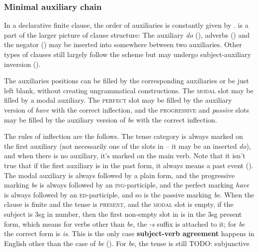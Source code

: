 \documentclass[UTF8, a4paper, oneside, scheme=plain]{ctexrep}
\newcommand*{\concept}[1]{\textbf{#1}}
\newcommand{\corpus}[1]{\emph{#1}}
\newcommand{\category}[1]{\textsc{#1}}
\newcommand{\corpuscat}[1]{\textsc{#1}}
\begin{document}
\subsubsection{Minimal auxiliary chain}

In a declarative finite clause,  
the order of auxiliaries is constantly given by .
 is a part of the larger picture of clause structure:
The auxiliary \corpus{do} (), 
adverbs ()
and the negator ()
may be inserted into somewhere between two auxiliaries.
Other types of clauses still largely follow the scheme but 
may undergo subject-auxiliary inversion ().

The auxiliaries positions can be filled by the corresponding auxiliaries or be just left blank,
without creating ungrammatical constructions.
The \category{modal} slot may be filled by a modal auxiliary.
The \category{perfect} slot may be filled by the auxiliary version of \corpus{have} with the correct inflection,
and the \category{progressive} and \corpus{passive} slots 
may be filled by the auxiliary version of \corpus{be} with the correct inflection.

The rules of inflection are the follows.
The tense category is always marked on the first auxiliary
(not necessarily one of the slots in 
-- it may be an inserted \corpus{do}),
and when there is no auxiliary,
it's marked on the main verb.
Note that it isn't true that if the first auxiliary is in the past form,
it always means a past event ().
The modal auxiliary is always followed by a plain form,
and the progressive marking \corpus{be} is always followed by an \corpuscat{ing}-participle,
and the perfect marking \corpus{have} is always followed by an \corpuscat{ed}-participle,
and so is the passive marking \corpus{be}.
When the clause is finite and the tense is \category{present},
and the \category{modal} slot is empty,
if the subject is 3sg in number,
then the first non-empty slot in 
is in the 3sg present form,
which means for verbs other than \corpus{be}, the \corpus{-s} suffix is attached to it;
for \corpus{be} the correct form is \corpus{is}.
This is the only case \concept{subject-verb agreement} happens in English 
other than the case of \corpus{be} ().
For \corpus{be}, the tense is still  TODO: subjunctive 
\end{document}
